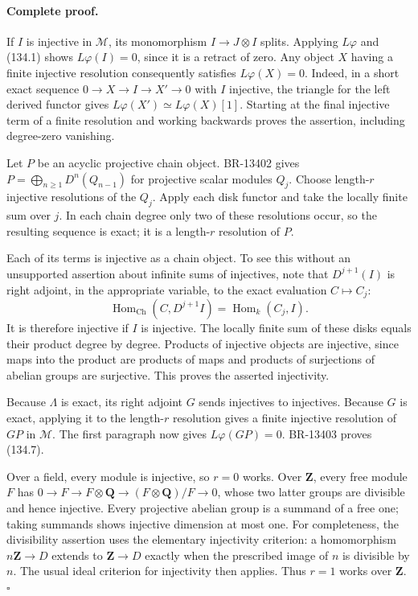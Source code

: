 \documentclass[11pt,a4paper]{article}
\theoremstyle{definition}\newtheorem{definition}[theorem]{Definition}
\theoremstyle{remark}\newtheorem{remark}[theorem]{Remark}
\begin{document}
\paragraph{Complete proof.}
If \(I\) is injective in \(\mathcal M\), its monomorphism
\(I\to J\otimes I\) splits.  Applying \(L\varphi\) and (134.1)
shows \(L\varphi(I)=0\), since it is a retract of zero.  Any object
\(X\) having a finite injective resolution consequently satisfies
\(L\varphi(X)=0\).  Indeed, in a short exact sequence
\(0\to X\to I\to X'\to0\) with \(I\) injective, the triangle for
the left derived functor gives
\(L\varphi(X')\simeq L\varphi(X)[1]\).  Starting at the final
injective term of a finite resolution and working backwards proves
the assertion, including degree-zero vanishing.

Let \(P\) be an acyclic projective chain object.  BR-13402 gives
\(P=\bigoplus_{n\geq1}D^n(Q_{n-1})\) for projective scalar
modules \(Q_j\).  Choose length-\(r\) injective resolutions of the
\(Q_j\).  Apply each disk functor and take the locally finite sum
over \(j\).  In each chain degree only two of these resolutions
occur, so the resulting sequence is exact; it is a length-\(r\)
resolution of \(P\).

Each of its terms is injective as a chain object.  To see this without
an unsupported assertion about infinite sums of injectives, note that
\(D^{j+1}(I)\) is right adjoint, in the appropriate variable, to
the exact evaluation \(C\mapsto C_j\):
\[
 \operatorname{Hom}_{\mathrm{Ch}}(C,D^{j+1}I)
    =\operatorname{Hom}_k(C_j,I).
\]
It is therefore injective if \(I\) is injective.  The locally finite
sum of these disks equals their product degree by degree.  Products
of injective objects are injective, since maps into the product are
products of maps and products of surjections of abelian groups are
surjective.  This proves the asserted injectivity.

Because \(\Lambda\) is exact, its right adjoint \(G\) sends
injectives to injectives.  Because \(G\) is exact, applying it to
the length-\(r\) resolution gives a finite injective resolution of
\(GP\) in \(\mathcal M\).  The first paragraph now gives
\(L\varphi(GP)=0\).  BR-13403 proves (134.7).

Over a field, every module is injective, so \(r=0\) works.  Over
\(\mathbf Z\), every free module \(F\) has
\(0\to F\to F\otimes\mathbf Q\to(F\otimes\mathbf Q)/F\to0\),
whose two latter groups are divisible and hence injective.  Every
projective abelian group is a summand of a free one; taking summands
shows injective dimension at most one.  For completeness, the
divisibility assertion uses the elementary injectivity criterion:
a homomorphism \(n\mathbf Z\to D\) extends to \(\mathbf Z\to D\)
exactly when the prescribed image of \(n\) is divisible by \(n\).
The usual ideal criterion for injectivity then applies.  Thus \(r=1\)
works over \(\mathbf Z\). \(\square\)
\end{document}
